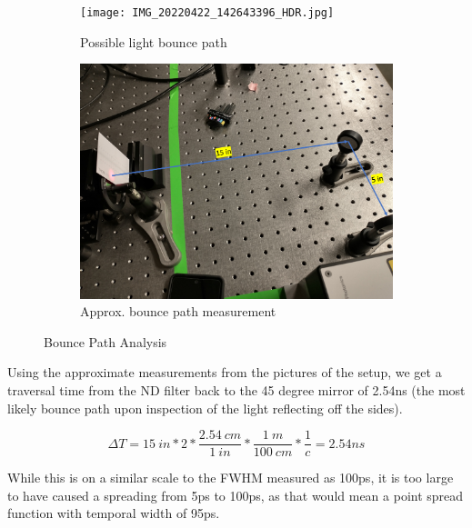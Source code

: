 \documentclass[a4paper]{article}
\begin{document}
%
%

\begin{figure}
     \centering
     \begin{subfigure}[b]{0.49\textwidth}
         \centering
         \texttt{[image: IMG\_20220422\_142643396\_HDR.jpg]}
         \caption{Possible light bounce path}
         \label{fig:light_path}
     \end{subfigure}
     \hfill
     \begin{subfigure}[b]{0.49\textwidth}
         \centering
         \includegraphics[width=\textwidth]{distance_drawing.png}
         \caption{Approx. bounce path measurement}
         \label{fig:light_path_measured}
     \end{subfigure}
        \caption{Bounce Path Analysis}
        \label{fig:light_path_all}
\end{figure}

Using the approximate measurements from the pictures of the setup, we get a traversal time from the ND filter back to the 45 degree mirror of 2.54ns (the most likely bounce path upon inspection of the light reflecting off the sides).

\[
\Delta T=15\ in * 2 * \frac{2.54\ cm}{1\ in} * \frac{1\ m}{100\ cm} * \frac{1}{c} = 2.54 ns
\]

While this is on a similar scale to the FWHM measured as 100ps, it is too large to have caused a spreading from 5ps to 100ps, as that would mean a point spread function with temporal width of 95ps. 
\end{document}
